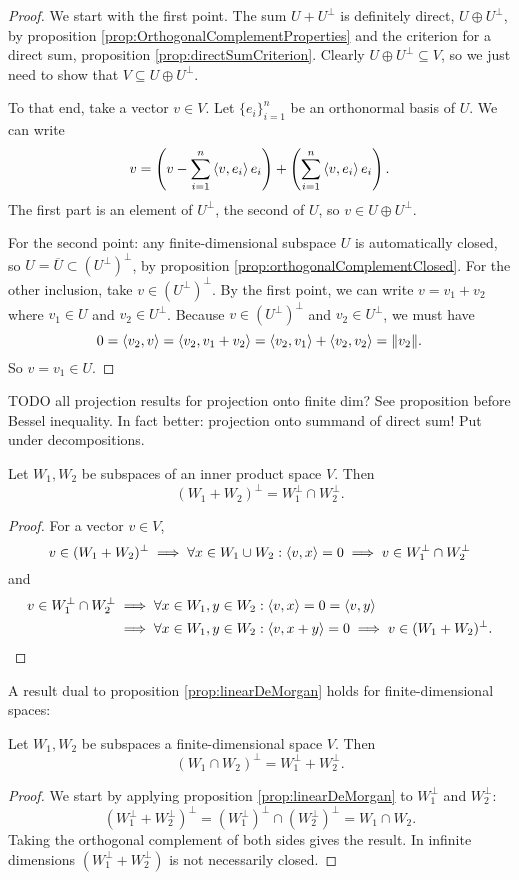 \begin{proof}
We start with the first point. The sum $U + U^\perp$ is definitely direct, $U\oplus U^\perp$, by proposition \ref{prop:OrthogonalComplementProperties} and the criterion for a direct sum, proposition \ref{prop:directSumCriterion}. Clearly $U\oplus U^\perp\subseteq V$, so we just need to show that $V \subseteq U\oplus U^\perp$.

To that end, take a vector $v\in V$. Let $\{e_i\}_{i=1}^n$ be an orthonormal basis of $U$. We can write
\[ v = \left(v - \sum_{i=1}^n\left\langle v,e_i \right\rangle e_i\right) + \left(\sum_{i=1}^n\left\langle v,e_i \right\rangle e_i\right). \]
The first part is an element of $U^\perp$, the second of $U$, so $v\in U\oplus U^\perp$.

For the second point: any finite-dimensional subspace $U$ is automatically closed, so $U = \overline{U} \subset (U^\perp)^\perp$, by proposition \ref{prop:orthogonalComplementClosed}. For the other inclusion, take $v\in (U^\perp)^\perp$. By the first point, we can write $v = v_1 + v_2$ where $v_1\in U$ and $v_2\in U^\perp$. Because $v\in (U^\perp)^\perp$ and $v_2\in U^\perp$, we must have
\[ 0 = \left\langle v_2, v \right\rangle = \left\langle v_2, v_1+v_2 \right\rangle = \left\langle v_2, v_1 \right\rangle + \left\langle v_2,v_2 \right\rangle = \lVert v_2\rVert. \]
So $v=v_1\in U$.
\end{proof}

TODO all projection results for projection onto finite dim? See proposition before Bessel inequality. In fact better: projection onto summand of direct sum! Put under decompositions.

\begin{proposition} \label{prop:linearDeMorgan}
Let $W_1,W_2$ be subspaces of an inner product space $V$. Then
\[ (W_1+W_2)^\perp = W_1^\perp \cap W_2^\perp. \]
\end{proposition}
\begin{proof}
For a vector $v\in V$,
\[  v\in (W_1+W_2)^\perp \implies \forall x\in W_1\cup W_2: \left\langle v,x \right\rangle = 0 \implies v\in W_1^\perp \cap W_2^\perp \]
and
\begin{align*}
v\in W_1^\perp \cap W_2^\perp &\implies \forall x\in W_1, y\in W_2: \left\langle v,x \right\rangle = 0 = \left\langle v,y \right\rangle \\
&\implies \forall x\in W_1, y\in W_2:\left\langle v, x+y \right\rangle = 0 \implies v\in (W_1+W_2)^\perp.
\end{align*}
\end{proof}

A result dual to proposition \ref{prop:linearDeMorgan} holds for finite-dimensional spaces:
\begin{proposition}
Let $W_1,W_2$ be subspaces a finite-dimensional space $V$. Then
\[ (W_1\cap W_2)^\perp = W_1^\perp + W_2^\perp. \]
\end{proposition}
\begin{proof}
We start by applying proposition \ref{prop:linearDeMorgan} to $W_1^\perp$ and $W_2^\perp$:
\[ (W_1^\perp+W_2^\perp)^\perp = (W_1^\perp)^\perp \cap (W_2^\perp)^\perp = W_1 \cap W_2. \]
Taking the orthogonal complement of both sides gives the result. In infinite dimensions $(W_1^\perp+W_2^\perp)$ is not necessarily closed. 
\end{proof}

